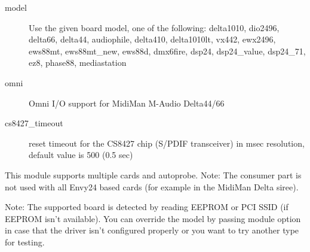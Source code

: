 \documentclass[a4paper,8pt,english]{sphinxmanual}
\begin{document}
\begin{description}
\item[{model}] \leavevmode
Use the given board model, one of the following:
delta1010, dio2496, delta66, delta44, audiophile, delta410,
delta1010lt, vx442, ewx2496, ews88mt, ews88mt\_new, ews88d,
dmx6fire, dsp24, dsp24\_value, dsp24\_71, ez8,
phase88, mediastation

\item[{omni}] \leavevmode
Omni I/O support for MidiMan M-Audio Delta44/66

\item[{cs8427\_timeout}] \leavevmode
reset timeout for the CS8427 chip (S/PDIF transceiver) in msec
resolution, default value is 500 (0.5 sec)

\end{description}

This module supports multiple cards and autoprobe.
Note: The consumer part is not used with all Envy24 based cards (for
example in the MidiMan Delta siree).

Note: The supported board is detected by reading EEPROM or PCI
SSID (if EEPROM isn't available).  You can override the
model by passing  module option in case that the
driver isn't configured properly or you want to try another
type for testing.
\end{document}
